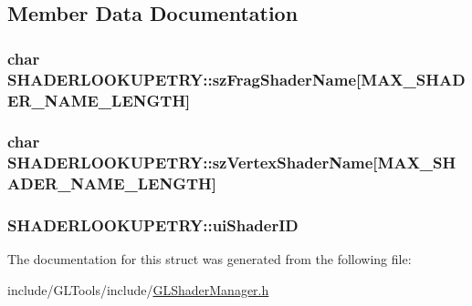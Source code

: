 \subsection{Member Data Documentation}
\hypertarget{struct_s_h_a_d_e_r_l_o_o_k_u_p_e_t_r_y_ac425eb553fc6bbab29dceb31b23c8384}{
\subsubsection[{sz\-Frag\-Shader\-Name}]{\setlength{\rightskip}{0pt plus 5cm}char S\-H\-A\-D\-E\-R\-L\-O\-O\-K\-U\-P\-E\-T\-R\-Y\-::sz\-Frag\-Shader\-Name\mbox{[}{\bf M\-A\-X\-\_\-\-S\-H\-A\-D\-E\-R\-\_\-\-N\-A\-M\-E\-\_\-\-L\-E\-N\-G\-T\-H}\mbox{]}}}\label{struct_s_h_a_d_e_r_l_o_o_k_u_p_e_t_r_y_ac425eb553fc6bbab29dceb31b23c8384}
\hypertarget{struct_s_h_a_d_e_r_l_o_o_k_u_p_e_t_r_y_a1ff17144cc05720a188f54680a911d3d}{
\subsubsection[{sz\-Vertex\-Shader\-Name}]{\setlength{\rightskip}{0pt plus 5cm}char S\-H\-A\-D\-E\-R\-L\-O\-O\-K\-U\-P\-E\-T\-R\-Y\-::sz\-Vertex\-Shader\-Name\mbox{[}{\bf M\-A\-X\-\_\-\-S\-H\-A\-D\-E\-R\-\_\-\-N\-A\-M\-E\-\_\-\-L\-E\-N\-G\-T\-H}\mbox{]}}}\label{struct_s_h_a_d_e_r_l_o_o_k_u_p_e_t_r_y_a1ff17144cc05720a188f54680a911d3d}
\hypertarget{struct_s_h_a_d_e_r_l_o_o_k_u_p_e_t_r_y_ab90ce8a60640adad877b5fda3839bdce}{
\subsubsection[{ui\-Shader\-I\-D}]{ S\-H\-A\-D\-E\-R\-L\-O\-O\-K\-U\-P\-E\-T\-R\-Y\-::ui\-Shader\-I\-D}}\label{struct_s_h_a_d_e_r_l_o_o_k_u_p_e_t_r_y_ab90ce8a60640adad877b5fda3839bdce}


The documentation for this struct was generated from the following file\-:\begin{DoxyCompactItemize}
\item 
include/\-G\-L\-Tools/include/\hyperlink{_g_l_shader_manager_8h}{G\-L\-Shader\-Manager.\-h}\end{DoxyCompactItemize}
